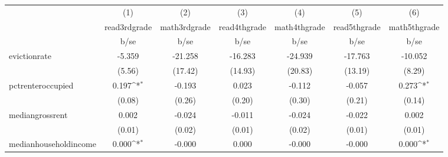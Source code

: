 {
\def\sym#1{\ifmmode^{#1}\else\(^{#1}\)\fi}
\begin{tabular}{l*{6}{c}}
\hline\hline
            &\multicolumn{1}{c}{(1)}           &\multicolumn{1}{c}{(2)}           &\multicolumn{1}{c}{(3)}           &\multicolumn{1}{c}{(4)}           &\multicolumn{1}{c}{(5)}           &\multicolumn{1}{c}{(6)}           \\
            &\multicolumn{1}{c}{read3rdgrade}  &\multicolumn{1}{c}{math3rdgrade}  &\multicolumn{1}{c}{read4thgrade}  &\multicolumn{1}{c}{math4thgrade}  &\multicolumn{1}{c}{read5thgrade}  &\multicolumn{1}{c}{math5thgrade}  \\
            &                     b/se         &                     b/se         &                     b/se         &                     b/se         &                     b/se         &                     b/se         \\
\hline
evictionrate&                   -5.359         &                  -21.258         &                  -16.283         &                  -24.939         &                  -17.763         &                  -10.052         \\
            &                   (5.56)         &                  (17.42)         &                  (14.93)         &                  (20.83)         &                  (13.19)         &                   (8.29)         \\
pctrenteroccupied&                    0.197\sym{*}  &                   -0.193         &                    0.023         &                   -0.112         &                   -0.057         &                    0.273\sym{*}  \\
            &                   (0.08)         &                   (0.26)         &                   (0.20)         &                   (0.30)         &                   (0.21)         &                   (0.14)         \\
mediangrossrent&                    0.002         &                   -0.024         &                   -0.011         &                   -0.024         &                   -0.022         &                    0.002         \\
            &                   (0.01)         &                   (0.02)         &                   (0.01)         &                   (0.02)         &                   (0.01)         &                   (0.01)         \\
medianhouseholdincome&                    0.000\sym{*}  &                   -0.000         &                    0.000         &                   -0.000         &                   -0.000         &                    0.000\sym{*}  \\

\end{tabular}}
